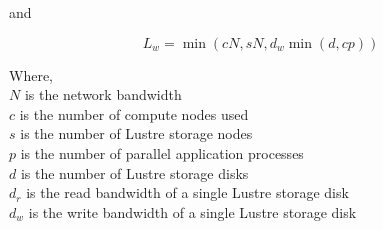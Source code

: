 \documentclass[10pt,journal,compsoc]{IEEEtran}
\begin{document}
    and


    \begin{equation}%
        L_{w} = \min{(cN, sN, d_{w}\min{(d, cp)})}
    \end{equation}

    {\noindent} Where, \\
    $N$ is the network bandwidth \\
    $c$ is the number of compute nodes used \\
    $s$ is the number of Lustre storage nodes \\
    $p$ is the number of parallel application processes \\
    $d$ is the number of Lustre storage disks \\
    $d_{r}$ is the read bandwidth of a single Lustre storage disk \\
    $d_{w}$ is the write bandwidth of a single Lustre storage disk \\





\end{document}
